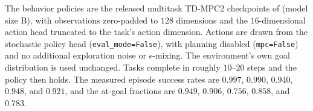The behavior policies are the released multitask TD-MPC2 checkpoints of \citet{hansen-iclr26a} (model size B), with observations zero-padded to $128$ dimensions and the $16$-dimensional action head truncated to the task's action dimension.
Actions are drawn from the stochastic policy head (\texttt{eval\_mode=False}), with planning disabled (\texttt{mpc=False}) and no additional exploration noise or $\epsilon$-mixing.
The environment's own goal distribution is used unchanged.
Tasks complete in roughly $10$--$20$ steps and the policy then holds.
The measured episode success rates are $0.997$, $0.990$, $0.940$, $0.948$, and $0.921$, and the at-goal fractions are $0.949$, $0.906$, $0.756$, $0.858$, and $0.783$.